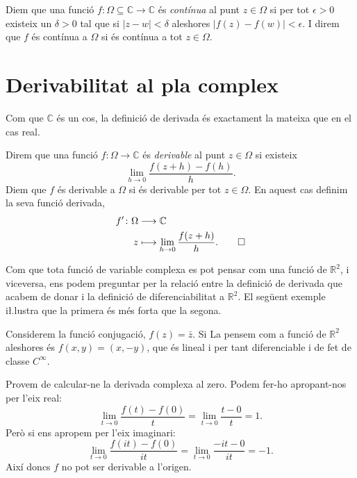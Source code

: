 \documentclass[12pt,twoside]{report}
\numberwithin{table}{section}
\numberwithin{equation}{section}
\numberwithin{figure}{section}
\newcommand{\R}{\ensuremath{\mathbb{R}}}
\newcommand{\C}{\ensuremath{\mathbb{C}}}
\newcommand{\abs}[1]{\left\lvert #1 \right\rvert}
\begin{document}
\begin{defn}[Continuïtat]
	Diem que una funció \( f \colon \Omega \subseteq \C \to \C \) és \emph{contínua} al punt \( z \in \Omega \) si per tot \( \epsilon > 0 \) existeix un \( \delta > 0 \) tal que si \( \abs{z - w} < \delta \) aleshores \( \abs{f(z) - f(w)} < \epsilon \). I direm que \( f \) és contínua a \( \Omega \) si és contínua a tot \( z \in \Omega \). 
\end{defn}

\section{Derivabilitat al pla complex}
Com que \( \C \) és un cos, la definició de derivada és exactament la mateixa que en el cas real. 
\begin{defn}\label{def:funcio holomorfa}
	Direm que una funció \( f \colon \Omega \to \C \) és \emph{derivable} al punt \( z \in \Omega \) si existeix
	\begin{equation*}
		\lim_{h \to 0}{\frac{f(z + h) - f(h)}{h}}.
	\end{equation*}
	Diem que \( f \) és derivable a \( \Omega \) si és derivable per tot \( z \in \Omega \). En aquest cas definim la seva funció derivada,
	\begin{align*}
		f' \colon \Omega & \longrightarrow \C \\
		z & \longmapsto \lim_{h \to 0}{\frac{f(z + h)}{h}}. \qedhere
	\end{align*}
\end{defn}
Com que tota funció de variable complexa es pot pensar com una funció de \( \R^2 \), i viceversa, ens podem preguntar per la relació entre la definició de derivada que acabem de donar i la definició de diferenciabilitat a \( \R^2 \). El següent exemple i\l.lustra que la primera és més forta que la segona.

\begin{exe}
	Considerem la funció conjugació, \( f(z) = \bar{z} \). Si La pensem com a funció de \( \R^2 \) aleshores és \( f(x,y) = (x, -y) \), que és lineal i per tant diferenciable i de fet de classe \( C^{\infty} \).
	
	Provem de calcular-ne la derivada complexa al zero. Podem fer-ho apropant-nos per l'eix real:
	\begin{equation*}
		\lim_{t \to 0}{\frac{f(t) - f(0)}{t}} = \lim_{t \to 0}{\frac{t - 0}{t}} = 1.
	\end{equation*}
	Però si ens apropem per l'eix imaginari:
	\begin{equation*}
		\lim_{t \to 0}{\frac{f(it) - f(0)}{it}} = \lim_{t \to 0}{\frac{-it - 0}{it}} = -1.
	\end{equation*}
	Així doncs \( f \) no pot ser derivable a l'origen.
\end{exe}
\end{document}
